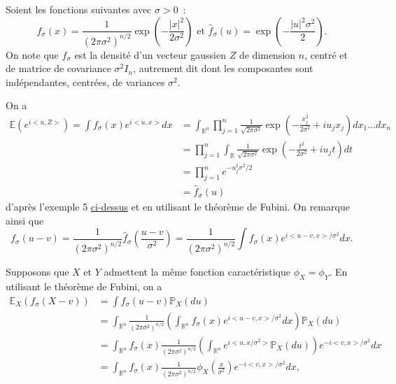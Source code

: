 \begin{preuve}
Soient les fonctions suivantes avec \(\sigma > 0\)~:
\[ f_\sigma (x) = \frac{1}{(2\pi \sigma^2)^{n/2}}\exp\left(-\frac{|x|^2}{2\sigma^2}\right) \text{ et } \widehat{f}_\sigma (u)= \exp\left(-\frac{|u|^2\sigma^2}{2}\right).\]
On note que \(f_\sigma\) est la densité d'un vecteur gaussien \(Z\) de
dimension \(n\), centré et de matrice de covariance \(\sigma^2 I_n\),
autrement dit dont les composantes sont indépendantes, centrées, de
variances \(\sigma^2\).

On a \begin{align*}
\mathbb{E}(e^{i < u,Z>}) = \int f_\sigma (x) e^{i < u,x>} dx &= \int_{\mathbb{R}^n} \prod_{j=1}^n \frac{1}{\sqrt{2\pi \sigma^2}}\exp\left(-\frac{x_j^2}{2\sigma^2}+iu_j x_j\right) dx_1\ldots dx_n \\
                                  &= \prod_{j=1}^n \int_{\mathbb{R}} \frac{1}{\sqrt{2\pi \sigma^2}}\exp\left(-\frac{t^2}{2\sigma^2}+iu_j t\right) dt \\
                                  &= \prod_{j=1}^n e^{-u_j^2\sigma^2/2}\\
                                  & = \widehat{f}_\sigma(u)
\end{align*} d'après l'exemple 5 \href{ex}{ci-dessus} et en utilisant le
théorème de Fubini. On remarque ainsi que
\[ f_\sigma (u-v) = \frac{1}{(2\pi \sigma^2)^{n/2}} \widehat{f}_{\sigma}\left(\frac{u-v}{\sigma^2}\right) = \frac{1}{(2\pi \sigma^2)^{n/2}} \int f_\sigma (x) e^{i < u -v ,x>/\sigma^2} dx.\]

Supposons que \(X\) et \(Y\) admettent la même fonction caractéristique
\(\phi_X = \phi_{Y}\). En utilisant le théorème de Fubini, on a
\begin{align*}
\mathbb{E}_X(f_\sigma (X-v)) &= \int f_\sigma (u-v) \mathbb{P}_X (du) \\
                       &= \int_{\mathbb{R}^n} \frac{1}{(2\pi \sigma^2)^{n/2}} \left( \int_{\mathbb{R}^n} f_\sigma (x) e^{i < u -v ,x>/\sigma^2} dx \right) \mathbb{P}_X (du)\\
                       &= \int_{\mathbb{R}^n} f_\sigma (x) \frac{1}{(2\pi \sigma^2)^{n/2}} \left( \int_{\mathbb{R}^n}  e^{i < u ,x/\sigma^2>} \mathbb{P}_X(du) \right) e^{-i < v ,x>/\sigma^2} dx\\
                       &= \int_{\mathbb{R}^n} f_\sigma (x) \frac{1}{(2\pi \sigma^2)^{n/2}} \phi_X\left(\frac{x}{\sigma^2}\right) e^{-i < v ,x>/\sigma^2} dx,
\end{align*}


\end{preuve}
